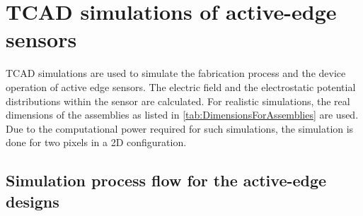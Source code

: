 \newpage
\section{TCAD simulations of active-edge sensors}

TCAD simulations are used to simulate the fabrication process and the
device operation of active edge sensors. The electric field and the
electrostatic potential distributions within the sensor are
calculated. For realistic simulations, the real dimensions of the
assemblies as listed in \cref{tab:DimensionsForAssemblies} are
used. Due to the computational power required for such simulations,
the simulation is done for two pixels in a 2D configuration.


\subsection{Simulation process flow for the active-edge designs}\label{sec:processFlow}



